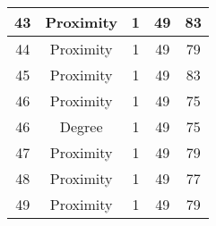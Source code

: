 \documentclass[results.tex]{subfiles}
\begin{document}
\begin{center}
\begin{tabular}{| c || c | c | c | c |}
            \hline
            43                      & Proximity                    & 1                      & 49                      & 83                   \\
            \hline
            44                      & Proximity                    & 1                      & 49                      & 79                   \\
            \hline
            45                      & Proximity                    & 1                      & 49                      & 83                   \\
            \hline
            46                      & Proximity                    & 1                      & 49                      & 75                   \\
            \hline
            46                      & Degree                       & 1                      & 49                      & 75                   \\
            \hline
            47                      & Proximity                    & 1                      & 49                      & 79                   \\
            \hline
            48                      & Proximity                    & 1                      & 49                      & 77                   \\
            \hline
            49                      & Proximity                    & 1                      & 49                      & 79                   \\
            \hline
        \end{tabular}
    \end{center}
\end{document}
